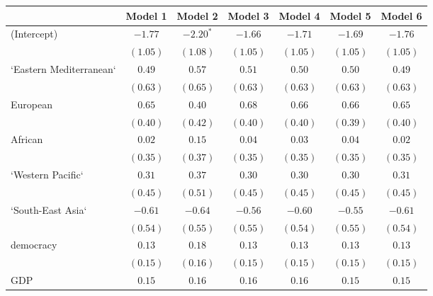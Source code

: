 
\begin{table}[!h]
\begin{center}
\begin{tabular}{l c c c c c c }
\toprule
 & Model 1 & Model 2 & Model 3 & Model 4 & Model 5 & Model 6 \\
\midrule
(Intercept)             & $-1.77$      & $-2.20^{*}$  & $-1.66$      & $-1.71$      & $-1.69$      & $-1.76$      \\
                        & $(1.05)$     & $(1.08)$     & $(1.05)$     & $(1.05)$     & $(1.05)$     & $(1.05)$     \\
`Eastern Mediterranean` & $0.49$       & $0.57$       & $0.51$       & $0.50$       & $0.50$       & $0.49$       \\
                        & $(0.63)$     & $(0.65)$     & $(0.63)$     & $(0.63)$     & $(0.63)$     & $(0.63)$     \\
European                & $0.65$       & $0.40$       & $0.68$       & $0.66$       & $0.66$       & $0.65$       \\
                        & $(0.40)$     & $(0.42)$     & $(0.40)$     & $(0.40)$     & $(0.39)$     & $(0.40)$     \\
African                 & $0.02$       & $0.15$       & $0.04$       & $0.03$       & $0.04$       & $0.02$       \\
                        & $(0.35)$     & $(0.37)$     & $(0.35)$     & $(0.35)$     & $(0.35)$     & $(0.35)$     \\
`Western Pacific`       & $0.31$       & $0.37$       & $0.30$       & $0.30$       & $0.30$       & $0.31$       \\
                        & $(0.45)$     & $(0.51)$     & $(0.45)$     & $(0.45)$     & $(0.45)$     & $(0.45)$     \\
`South-East Asia`       & $-0.61$      & $-0.64$      & $-0.56$      & $-0.60$      & $-0.55$      & $-0.61$      \\
                        & $(0.54)$     & $(0.55)$     & $(0.55)$     & $(0.54)$     & $(0.55)$     & $(0.54)$     \\
democracy               & $0.13$       & $0.18$       & $0.13$       & $0.13$       & $0.13$       & $0.13$       \\
                        & $(0.15)$     & $(0.16)$     & $(0.15)$     & $(0.15)$     & $(0.15)$     & $(0.15)$     \\
GDP                     & $0.15$       & $0.16$       & $0.16$       & $0.16$       & $0.15$       & $0.15$       \\

\end{tabular}
\end{center}
\end{table}
